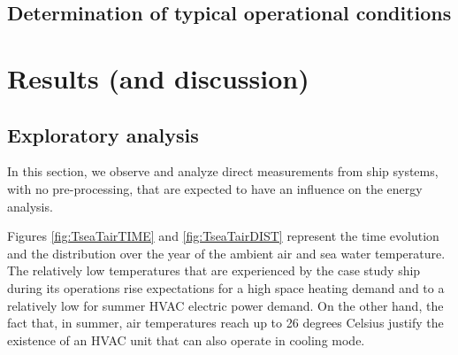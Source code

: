 \documentclass[preprint,12pt]{elsarticle}
\begin{document}
\subsection{Determination of typical operational conditions}












\section{Results (and discussion)}

\subsection{Exploratory analysis} \label{sec:res:exploratory}

In this section, we observe and analyze direct measurements from ship systems, with no pre-processing, that are expected to have an influence on the energy analysis.

Figures \ref{fig:TseaTairTIME} and \ref{fig:TseaTairDIST} represent the time evolution and the distribution over the year of the ambient air and sea water temperature. The relatively low temperatures that are experienced by the case study ship during its operations rise expectations for a high space heating demand and to a relatively low for summer HVAC electric power demand. On the other hand, the fact that, in summer, air temperatures reach up to 26 degrees Celsius justify the existence of an HVAC unit that can also operate in cooling mode. 
\end{document}
